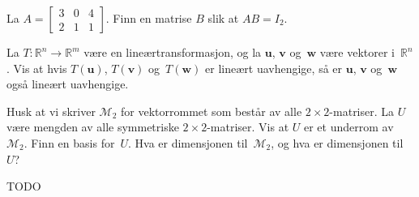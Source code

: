 \documentclass[titlepage,a4paper,12pt,norsk]{IMFeksamen}
\newcommand{\R}{\mathbb{R}}
\newcommand{\M}{\mathcal{M}} %
\newcommand{\V}[1]{\mathbf{#1}}
\renewcommand{\u}{\V{u}}
\renewcommand{\v}{\V{v}}
\newcommand{\w}{\V{w}}
\newcommand{\0}{\V{0}}
\begin{document}
\begin{oppgave}
La %
$
A =
\begin{bmatrix}
3 & 0 & 4 \\
2 & 1 & 1
\end{bmatrix}
$.
Finn en matrise $B$ slik at $AB = I_2$.
\end{oppgave}


\begin{oppgave}
La $T \colon \R^n \to \R^m$ være en lineærtransformasjon, og la $\u$,
$\v$ og~$\w$ være vektorer i~$\R^n$.  Vis at hvis $T(\u)$, $T(\v)$
og~$T(\w)$ er lineært uavhengige, så er $\u$, $\v$ og~$\w$ også
lineært uavhengige.
\end{oppgave}


\begin{oppgave}
Husk at vi skriver $\M_2$ for vektorrommet som består av alle $2 \times 2$-matriser.
La $U$ være mengden av alle symmetriske $2 \times 2$-matriser.
Vis at $U$ er et underrom av~$\M_2$.
Finn en basis for~$U$.  Hva er dimensjonen til~$\M_2$, og hva er dimensjonen til~$U$?
\end{oppgave}


\begin{oppgave}
TODO
\end{oppgave}
\end{document}

